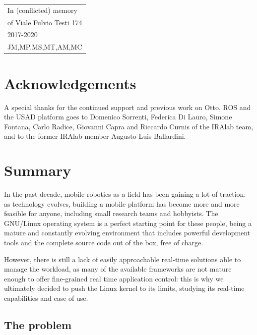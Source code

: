 \documentclass[a4paper,12pt]{report}
\begin{document}

\newpage
\begin{flushright}
  \itshape
  \begin{tabular}{@{}l@{}}
    In (conflicted) memory\\of Viale Fulvio Testi 174\\
    2017-2020\\JM,MP,MS,MT,AM,MC 
  \end{tabular}
\end{flushright}
\newpage
\tableofcontents
\newpage
\setlength{\parskip}{1em}
\chapter*{Acknowledgements}
A special thanks for the continued support and previous work on Otto, ROS and the USAD platform goes to Domenico Sorrenti, Federica Di Lauro, Simone Fontana, Carlo Radice, Giovanni Capra and Riccardo Curnis of the IRAlab team, and to the former IRAlab member Augusto Luis Ballardini.

\chapter{Summary}

In the past decade, mobile robotics as a field has been gaining a lot of traction: as technology evolves, building a mobile platform has become more and more feasible for anyone, including small research teams and hobbyists. The GNU/Linux operating system is a perfect starting point for these people, being a mature and constantly evolving environment that includes powerful development tools and the complete source code out of the box, free of charge.

However, there is still a lack of easily approachable real-time solutions able to manage the workload, as many of the available frameworks are not mature enough to offer fine-grained real time application control: this is why we ultimately decided to push the Linux kernel to its limits, studying its real-time capabilities and ease of use.

\section{The problem}
\end{document}
